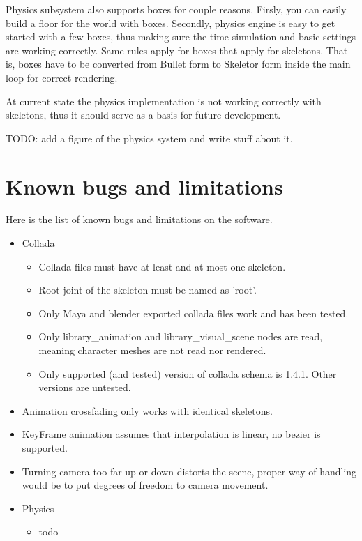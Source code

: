 \documentclass[11pt,twoside,a4paper]{article}
\begin{document}
Physics subsystem also supports boxes for couple reasons. Firsly, you can easily build a floor for the world with boxes. Secondly, physics engine is easy to get started with a few boxes, thus making sure the time simulation and basic settings are working correctly. Same rules apply for boxes that apply for skeletons. That is, boxes have to be converted from Bullet form to Skeletor form inside the main loop for correct rendering.

At current state the physics implementation is not working correctly with skeletons, thus it should serve as a basis for future development.

TODO: add a figure of the physics system and write stuff about it.

\section{Known bugs and limitations}

Here is the list of known bugs and limitations on the software.

\begin{itemize}
  \item Collada
  \begin{itemize}
    \item Collada files must have at least and at most one skeleton.
    \item Root joint of the skeleton must be named as 'root'.
    \item Only Maya and blender exported collada files work and has been tested.
    \item Only library\_animation and library\_visual\_scene nodes are read, meaning character meshes are not read nor rendered.
    \item Only supported (and tested) version of collada schema is 1.4.1. Other versions are untested.
  \end{itemize}
  \item Animation crossfading only works with identical skeletons.
  \item KeyFrame animation assumes that interpolation is linear, no bezier is supported.
  \item Turning camera too far up or down distorts the scene, proper way of handling would be to put degrees of freedom to camera movement.
  \item Physics
  \begin{itemize}
    \item todo
  \end{itemize}
\end{itemize}
\end{document}

